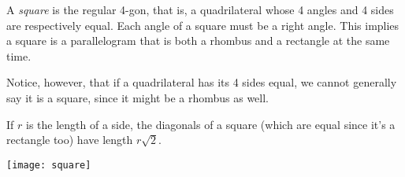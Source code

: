 \documentclass{article}
\begin{document}
A \emph{square} is the regular 4-gon, that is,  a quadrilateral whose 4 angles and 4 sides are respectively equal.  Each angle of a square must be a right angle. 
This implies a square is a parallelogram that is both a rhombus and a rectangle at the same time.

Notice, however, that if a quadrilateral has its 4 sides equal, we cannot generally say it is a square, since it might be a rhombus as well.

If $r$ is the length of a side, the diagonals of a square (which are equal since it's a rectangle too) have length $r\sqrt{2}$.

\texttt{[image: square]}
\end{document}
